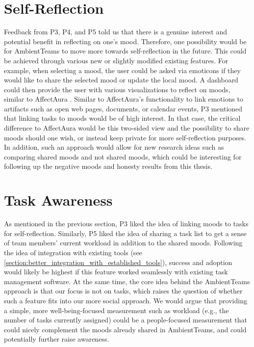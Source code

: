 \section{Self-Reflection}
Feedback from P3, P4, and P5 told us that there is a genuine interest and potential benefit in reflecting on one's mood. Therefore, one possibility would be for AmbientTeams to move more towards self-reflection in the future. This could be achieved through various new or slightly modified existing features. For example, when selecting a mood, the user could be asked via emoticons if they would like to share the selected mood or update the local mood. A dashboard could then provide the user with various visualizations to reflect on moods, similar to AffectAura \autocite{mcduff2012affectaura}. Similar to AffectAura's functionality to link emotions to artifacts such as open web pages, documents, or calendar events, P3 mentioned that linking tasks to moods would be of high interest. In that case, the critical difference to AffectAura would be this two-sided view and the possibility to share moods should one wish, or instead keep private for more self-reflection purposes. In addition, such an approach would allow for new research ideas such as comparing shared moods and not shared moods, which could be interesting for following up the negative moods and honesty results from this thesis.

\section{Task Awareness}
As mentioned in the previous section, P3 liked the idea of linking moods to tasks for self-reflection. Similarly, P5 liked the idea of sharing a task list to get a sense of team members' current workload in addition to the shared moods. Following the idea of integration with existing tools (see \autoref{section:better_integration_with_established_tools}), success and adoption would likely be highest if this feature worked seamlessly with existing task management software. At the same time, the core idea behind the AmbientTeams approach is that our focus is not on tasks, which raises the question of whether such a feature fits into our more social approach. We would argue that providing a simple, more well-being-focused measurement such as workload (e.g., the number of tasks currently assigned) could be a people-focused measurement that could nicely complement the moods already shared in AmbientTeams, and could potentially further raise awareness.


